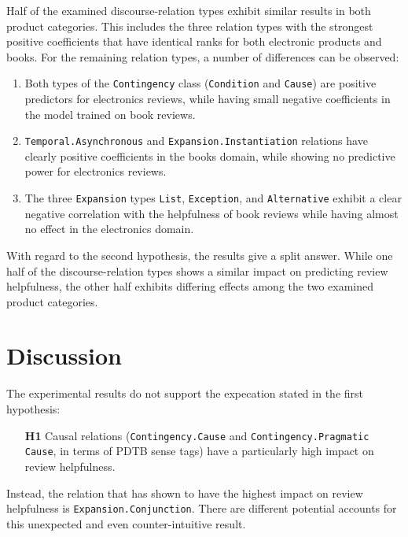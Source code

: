\documentclass[
    a4paper,%
    12pt,%
    oneside,%
    toc=bibliography,
    final,
]{scrartcl}
\begin{document}
Half of the examined discourse-relation types exhibit similar results in both product categories. This includes the three relation types with the strongest positive coefficients that have identical ranks for both electronic products and books. For the remaining relation types, a number of differences can be observed: 

\begin{enumerate}
\item Both types of the \lstinline|Contingency| class (\lstinline|Condition| and \lstinline|Cause|) are positive predictors for electronics reviews, while having small negative coefficients in the model trained on book reviews.
\item \lstinline|Temporal.Asynchronous| and \lstinline|Expansion.Instantiation| relations have clearly positive coefficients in the books domain, while showing no predictive power for electronics reviews.
\item The three \lstinline|Expansion| types \lstinline|List|, \lstinline|Exception|, and \lstinline|Alternative| exhibit a clear negative correlation with the helpfulness of book reviews while having almost no effect in the electronics domain.
\end{enumerate}

With regard to the second hypothesis, the results give a split answer. While one half of the discourse-relation types shows a similar impact on predicting review helpfulness, the other half exhibits differing effects among the two examined product categories.

\section{Discussion}
\label{sec:discussion}

The experimental results do not support the expecation stated in the first hypothesis:

\begin{enumerate}[rightmargin=1cm]
\item[\textbf{H1}] Causal relations (\lstinline|Contingency.Cause| and \lstinline|Contingency.Pragmatic Cause|, in terms of PDTB sense tags) have a particularly high impact on review helpfulness.
\end{enumerate}

\begin{sloppypar}
Instead, the relation that has shown to have the highest impact on review helpfulness is \lstinline|Expansion.Conjunction|. There are different potential accounts for this unexpected and even counter-intuitive result.
\end{sloppypar}
\end{document}
